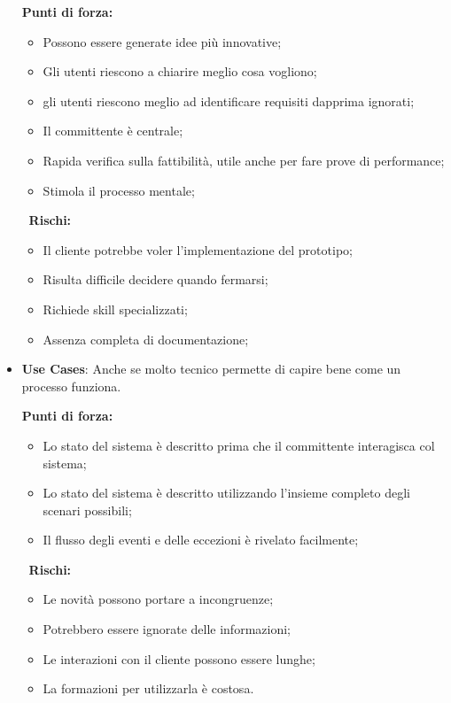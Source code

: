 \begin{itemize}
	\begin{info}[]
		\textbf{Punti di forza:}
		\begin{itemize}
			\item Possono essere generate idee più innovative;
			\item Gli utenti riescono a chiarire meglio cosa vogliono;
			\item gli utenti riescono meglio ad identificare requisiti dapprima ignorati;
			\item Il committente è centrale;
			\item Rapida verifica sulla fattibilità, utile anche per fare prove di performance;
			\item Stimola il processo mentale;
		\end{itemize}
		$\;\;$\textbf{Rischi:}
		\begin{itemize}
			\item Il cliente potrebbe voler l'implementazione del prototipo;
			\item Risulta difficile decidere quando fermarsi;
			\item Richiede skill specializzati;
			\item Assenza completa di documentazione;
		\end{itemize}
	\end{info}
	\item \textbf{Use Cases}: Anche se molto tecnico permette di capire bene come un processo funziona.
	\begin{info}[]
		\textbf{Punti di forza:}
		\begin{itemize}
			\item Lo stato del sistema è descritto prima che il committente interagisca col sistema;
			\item Lo stato del sistema è descritto utilizzando l'insieme completo degli scenari possibili;
			\item Il flusso degli eventi e delle eccezioni è rivelato facilmente;
		\end{itemize}
		$\;\;$\textbf{Rischi:}
		\begin{itemize}
			\item Le novità possono portare a incongruenze;
			\item Potrebbero essere ignorate delle informazioni;
			\item Le interazioni con il cliente possono essere lunghe;
			\item La formazioni per utilizzarla è costosa.
		\end{itemize}
	\end{info}
\end{itemize}
